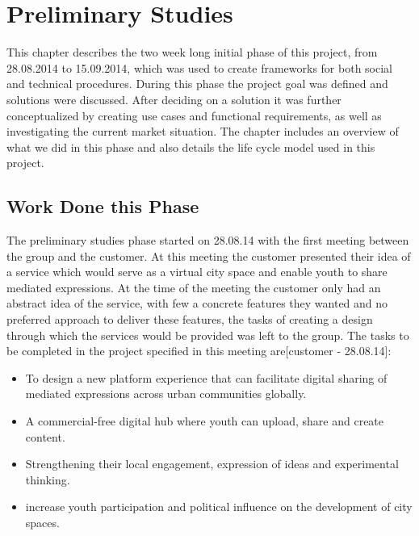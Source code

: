 \chapter{Preliminary Studies}
\label{chap:Prelim}

This chapter describes the two week long initial phase of this project, from 28.08.2014 to 15.09.2014, which was used to create frameworks for both social and technical procedures. During this phase the project goal was defined and solutions were discussed. After deciding on a solution it was further conceptualized by creating use cases and functional requirements, as well as investigating the current market situation. The chapter includes an overview of what we did in this phase and also details the life cycle model used in this project.

\section{Work Done this Phase}
\label{sec:PrelimWork}
The preliminary studies phase started on 28.08.14 with the first meeting between the group and the customer. At this meeting the customer presented their idea of a service which would serve as a virtual city space and enable youth to share mediated expressions. At the time of the meeting the customer only had an abstract idea of the service, with few a concrete features they wanted and no preferred approach to deliver these features, the tasks of creating a design through which the services would be provided was left to the group. The tasks to be completed in the project specified in this meeting are[customer - 28.08.14]:
\begin{itemize}
  \item To design a new platform experience that can facilitate digital sharing of mediated expressions across urban communities globally.
  \item A commercial-free digital hub where youth can upload, share and create content.
  \item Strengthening their local engagement, expression of ideas and experimental thinking.
  \item increase youth participation and political influence on the development of city spaces.
\end{itemize}


